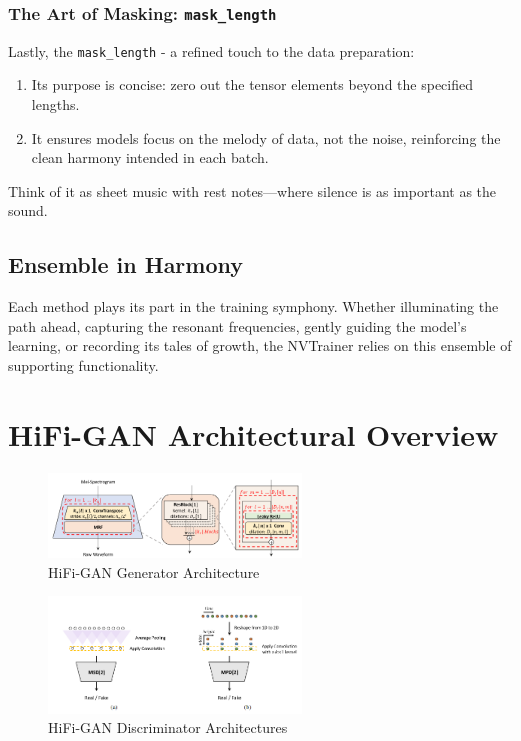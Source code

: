\documentclass[a4paper]{article}
\begin{document}
\subsubsection{The Art of Masking: \texttt{mask\_length}}
Lastly, the \texttt{mask\_length} - a refined touch to the data preparation:
\begin{enumerate}
  \item Its purpose is concise: zero out the tensor elements beyond the specified lengths.
  \item It ensures models focus on the melody of data, not the noise, reinforcing the clean harmony intended in each batch.
\end{enumerate}
Think of it as sheet music with rest notes—where silence is as important as the sound.

\subsection{Ensemble in Harmony}
Each method plays its part in the training symphony. Whether illuminating the path ahead, capturing the resonant frequencies, gently guiding the model's learning, or recording its tales of growth, the NVTrainer relies on this ensemble of supporting functionality.


\clearpage

\section{HiFi-GAN Architectural Overview}

\begin{figure}[H]
  \centering
  \includegraphics[width=0.6\textwidth]{hifigan-generator.png}
  \caption{HiFi-GAN Generator Architecture}
  \label{fig:hifigan-generator}
\end{figure}

\begin{figure}[H]
  \centering
  \includegraphics[width=0.6\textwidth]{hifigan-discriminators.png}
  \caption{HiFi-GAN Discriminator Architectures}
  \label{fig:hifigan-discriminators}
\end{figure}
\end{document}
